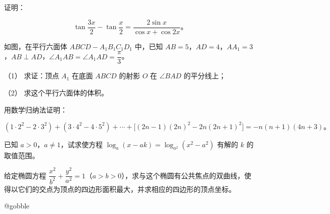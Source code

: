 \begin{question}

证明：

\nopagebreak[4]
\[
\tan\frac{3x}{2}-\tan\frac{x}{2}=\frac{2\sin x}{\cos x+\cos2x}\text{。}
\]

\long{}
\long\edef\gkcurrentedition{\gkheadR}
\ifx\gkcurrentedition\gkquestionedition
\Needspace{0.65\textheight}
\fi

\Needspace{0.4\textheight}
\end{question}
\begin{question}

如图，在平行六面体 $ABCD-A_1B_1C_1D_1$ 中，已知 $AB=5$，$AD=4$，$AA_1=3$，$AB\perp AD$，$\angle A_1AB=\angle A_1AD=\dfrac\pi3$。

（1） 求证：顶点 $A_1$ 在底面 $ABCD$ 的射影 $O$ 在 $\angle BAD$ 的平分线上；

（2） 求这个平行六面体的体积。
\nopagebreak[4]
\begin{center}\end{center}
\nopagebreak[4]
\end{question}
\begin{question}

用数学归纳法证明：

\nopagebreak[4]
\[
(1\cdot2^2-2\cdot3^2)+(3\cdot4^2-4\cdot5^2)+\cdots
+\bigl[(2n-1)(2n)^2-2n(2n+1)^2\bigr]
=-n(n+1)(4n+3)\text{。}
\]

\end{question}
\begin{question}

已知 $a>0$，$a\ne1$，试求使方程 $\log_a(x-ak)=\log_{a^2}(x^2-a^2)$ 有解的 $k$ 的取值范围。

\end{question}
\begin{question}

给定椭圆方程 $\dfrac{x^2}{b^2}+\dfrac{y^2}{a^2}=1$（$a>b>0$），求与这个椭圆有公共焦点的双曲线，使得以它们的交点为顶点的四边形面积最大，并求相应的四边形的顶点坐标。

\long{}
\long\edef\gkcurrentedition{\gkheadR}
\ifx\gkcurrentedition\gkshortedition
\global\expandafter\let\expandafter\Needspace\csname @gobble\endcsname
\fi

\end{question}
